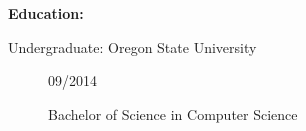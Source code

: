\documentclass[11pt]{article}
\begin{document}
\smallskip
{\huge \textbf{Education:}}
\hrulefill
\begin{description}
\item[Undergraduate: Oregon State University]
\hfill 09/2014

Bachelor of Science in Computer Science
\end{description}
\end{document}
